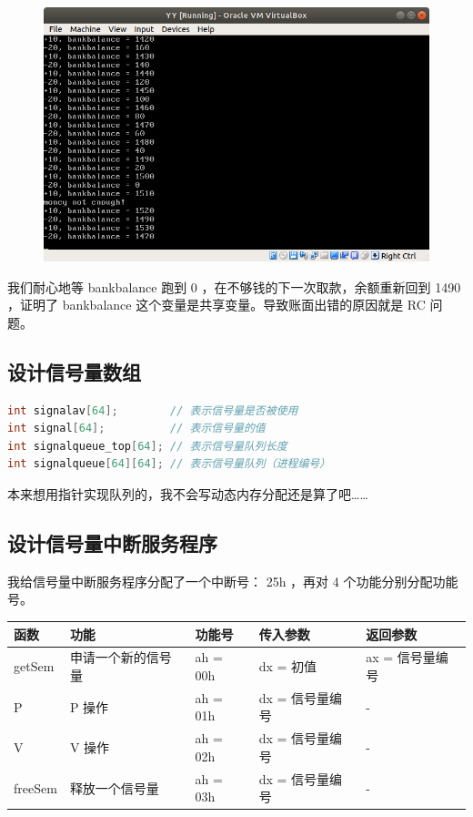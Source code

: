 \documentclass[a4paper]{article}
\begin{document}
\newpage

\begin{figure}[!hbp]
	\centering
	\includegraphics[scale=0.55]{pics/2.png}
\end{figure}

我们耐心地等 bankbalance 跑到 0 ，在不够钱的下一次取款，余额重新回到 1490 ，证明了 bankbalance 这个变量是共享变量。导致账面出错的原因就是 RC 问题。

\subsection{设计信号量数组}

\begin{lstlisting}[language=C]
int signalav[64];        // 表示信号量是否被使用
int signal[64];          // 表示信号量的值
int signalqueue_top[64]; // 表示信号量队列长度
int signalqueue[64][64]; // 表示信号量队列（进程编号）
\end{lstlisting}

本来想用指针实现队列的，我不会写动态内存分配还是算了吧……

\subsection{设计信号量中断服务程序}

我给信号量中断服务程序分配了一个中断号： 25h ，再对 4 个功能分别分配功能号。

\begin{table}[!hbp]
\centering
\begin{tabular}{|l|l|l|l|l|}
\hline
函数 & 功能 & 功能号 & 传入参数 & 返回参数 \\
\hline
getSem & 申请一个新的信号量 & ah = 00h & dx = 初值 & ax = 信号量编号 \\
\hline
P & P 操作 & ah = 01h & dx = 信号量编号 & - \\
\hline
V & V 操作 & ah = 02h & dx = 信号量编号 & - \\
\hline
freeSem & 释放一个信号量 & ah = 03h & dx = 信号量编号 & - \\
\hline
\end{tabular}
\end{table}
\end{document}

